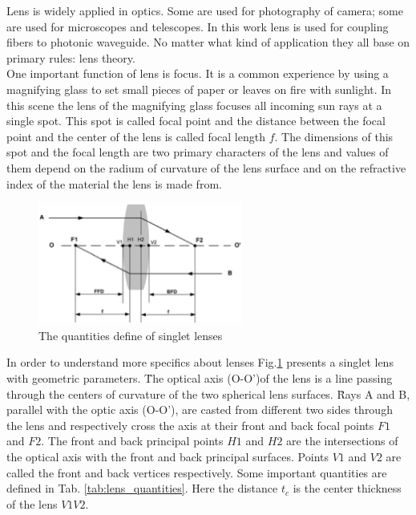 Lens is widely applied in optics. Some are used for photography of camera; some are used for microscopes and telescopes.  In this work lens is used for coupling fibers to photonic waveguide. No matter what kind of application they all base on primary rules: lens theory.\\
One important function of lens is focus. It is a common experience by using a magnifying glass to set small pieces of paper or leaves on fire with sunlight. In this scene the lens of the magnifying glass focuses all incoming sun rays at a single spot. This spot is called focal point and the distance between the focal point and the center of the lens is called focal length $f$. The dimensions of this spot and the focal length are two primary characters of the lens and values of them depend on the radium of curvature of the lens surface and on the refractive index of the material the lens is made from. \\
\begin{figure}[httbp]
\centering
\includegraphics[width=0.6\textwidth]{bilder/lens_define}
\caption{The quantities define of singlet lenses \cite{lens_theory_LC_Ltd}}
\label{fig:lens_define}
\end{figure}
In order to understand more specifics about lenses Fig.\ref{fig:lens_define}  presents a singlet lens with geometric parameters. \"The optical axis (O-O')of the lens is a line passing through the centers of curvature of the two spherical lens surfaces. \"
Rays A and B, parallel with the optic axis (O-O'), are casted from different two sides through the lens and respectively cross the axis at their front and back focal points $F1$ and $F2$. The front and back principal points $H1$ and $H2$ are the intersections of the optical axis with the front and back principal surfaces. Points $V1$ and $V2$ are called the front and back vertices respectively\cite{lens_theory_LC_Ltd}.  Some important quantities are defined in Tab. \ref{tab:lens_quantities}. Here the distance $t_{c}$ is the center thickness of the lens $V1V2$.\\
